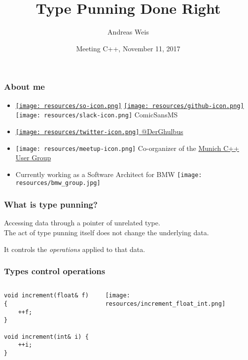 \documentclass[aspectratio=169]{beamer}
\title{Type Punning Done Right}
\author{Andreas Weis}
\institute{BMW AG}
\date{Meeting C++, November 11, 2017}
\newif\iftransitions
\begin{document}
\frame{\titlepage}

\begin{frame}[fragile]
  \frametitle{About me}

  \begin{itemize}
    \setlength\itemsep{1.5em}

    \item \href{https://stackoverflow.com/users/577603/comicsansms}{\texttt{[image: resources/so-icon.png]}} \href{https://github.com/ComicSansMS}{\texttt{[image: resources/github-icon.png]}} \texttt{[image: resources/slack-icon.png]} ComicSansMS

    \item \href{https://twitter.com/DerGhulbus/}{\texttt{[image: resources/twitter-icon.png]} @DerGhulbus}

    \item \texttt{[image: resources/meetup-icon.png]} Co-organizer of the \href{https://www.meetup.com/MUCplusplus/}{Munich C++ User Group}

    \item Currently working as a Software Architect for BMW \texttt{[image: resources/bmw\_group.jpg]}

  \end{itemize}
\end{frame}


\begin{frame}[fragile]
  \frametitle{What is type punning?}

  \iftransitions \pause \fi

  Accessing data through a pointer of unrelated type. \\[2ex]

  \iftransitions \pause \fi
   
  The act of type punning itself does not change the underlying data.
  
  It controls the \emph{operations} applied to that data.
\end{frame}


\begin{frame}[fragile]
  \frametitle{Types control operations}
  \setlength{\tabcolsep}{12pt}
  \begin{columns}
 
    \begin{lstlisting}
void increment(float& f) {
    ++f;
}

void increment(int& i) {
    ++i;
}
    \end{lstlisting}
    \iftransitions \pause \fi
    \texttt{[image: resources/increment\_float\_int.png]}
  \end{columns}
\end{frame}
\end{document}
